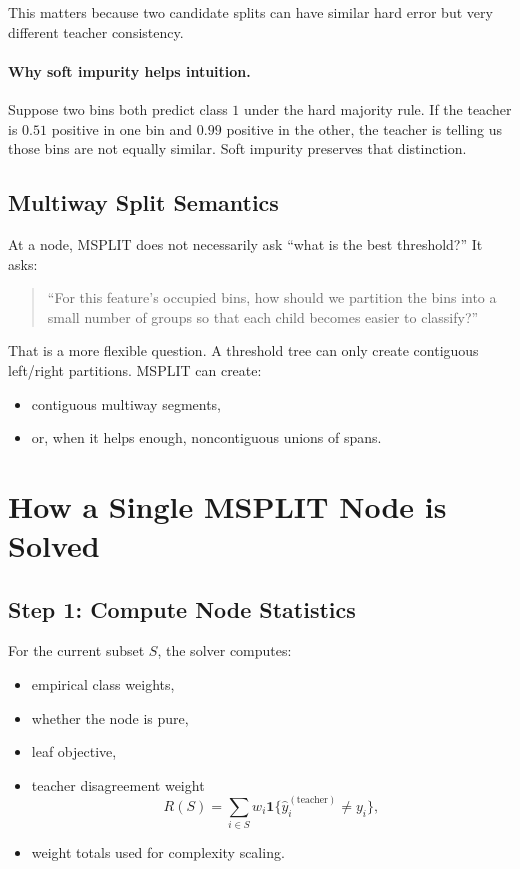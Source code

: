 \documentclass[11pt]{article}
\begin{document}
This matters because two candidate splits can have similar hard error but very different teacher consistency.

\paragraph{Why soft impurity helps intuition.}
Suppose two bins both predict class \(1\) under the hard majority rule. If the teacher is \(0.51\) positive in one bin and \(0.99\) positive in the other, the teacher is telling us those bins are not equally similar. Soft impurity preserves that distinction.

\subsection{Multiway Split Semantics}

At a node, MSPLIT does not necessarily ask ``what is the best threshold?'' It asks:

\begin{quote}
``For this feature's occupied bins, how should we partition the bins into a small number of groups so that each child becomes easier to classify?''
\end{quote}

That is a more flexible question. A threshold tree can only create contiguous left/right partitions. MSPLIT can create:

\begin{itemize}
\item contiguous multiway segments,
\item or, when it helps enough, noncontiguous unions of spans.
\end{itemize}

\section{How a Single MSPLIT Node is Solved}

\subsection{Step 1: Compute Node Statistics}

For the current subset \(S\), the solver computes:

\begin{itemize}
\item empirical class weights,
\item whether the node is pure,
\item leaf objective,
\item teacher disagreement weight
\[
R(S) = \sum_{i \in S} w_i \mathbf{1}\{\hat{y}^{(\mathrm{teacher})}_i \ne y_i\},
\]
\item weight totals used for complexity scaling.
\end{itemize}
\end{document}

